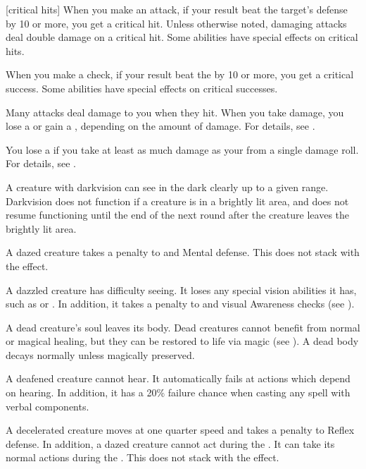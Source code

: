 [critical hits] When you make an attack, if your result beat the target's defense by 10 or more, you get a critical hit.
Unless otherwise noted, damaging attacks deal double damage on a critical hit.
Some abilities have special effects on critical hits.

 When you make a check, if your result beat the  by 10 or more, you get a critical success.
Some abilities have special effects on critical successes.

 Many attacks deal damage to you when they hit.
When you take damage, you lose a  or gain a , depending on the amount of damage.
For details, see .

 You lose a  if you take at least as much damage as your  from a single damage roll.
For details, see .

 A creature with darkvision can see in the dark clearly up to a given range.
Darkvision does not function if a creature is in a brightly lit area, and does not resume functioning until the end of the next round after the creature leaves the brightly lit area.

 A dazed creature takes a  penalty to  and Mental defense.
This does not stack with the  effect.

 A dazzled creature has difficulty seeing.
It loses any special vision abilities it has, such as  or .
In addition, it takes a  penalty to  and visual Awareness checks (see ).

 A dead creature's soul leaves its body. Dead creatures cannot benefit from normal or magical healing, but they can be restored to life via magic (see ). A dead body decays normally unless magically preserved.

 A deafened creature cannot hear. It automatically fails at actions which depend on hearing. In addition, it has a 20\% failure chance when casting any spell with verbal components.

 A decelerated creature moves at one quarter speed and takes a  penalty to Reflex defense.
In addition, a dazed creature cannot act during the .
It can take its normal actions during the .
This does not stack with the  effect.

